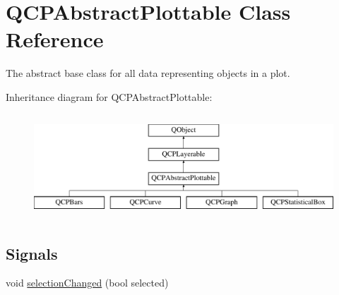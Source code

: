 \hypertarget{classQCPAbstractPlottable}{\section{Q\-C\-P\-Abstract\-Plottable Class Reference}
\label{classQCPAbstractPlottable}
}


The abstract base class for all data representing objects in a plot.  


Inheritance diagram for Q\-C\-P\-Abstract\-Plottable\-:\begin{figure}[H]
\begin{center}
\leavevmode
\includegraphics[height=3.943662cm]{classQCPAbstractPlottable}
\end{center}
\end{figure}
\subsection*{Signals}
\begin{DoxyCompactItemize}
\item 
void \hyperlink{classQCPAbstractPlottable_a3af66432b1dca93b28e00e78a8c7c1d9}{selection\-Changed} (bool selected)
\end{DoxyCompactItemize}
